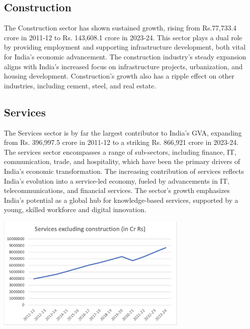 \documentclass[a4paper,12pt]{extarticle} %
\begin{document}
\subsection{Construction}
The Construction sector has shown sustained growth, rising from Rs.77,733.4 crore in 2011-12 to Rs. 143,608.1 crore in 2023-24. This sector plays a dual role by providing employment and supporting infrastructure development, both vital for India’s economic advancement. The construction industry’s steady expansion aligns with India’s increased focus on infrastructure projects, urbanization, and housing development. Construction’s growth also has a ripple effect on other industries, including cement, steel, and real estate.\\

\subsection{Services}
The Services sector is by far the largest contributor to India’s GVA, expanding from Rs. 396,997.5 crore in 2011-12 to a striking Rs. 866,921 crore in 2023-24. The services sector encompasses a range of sub-sectors, including finance, IT, communication, trade, and hospitality, which have been the primary drivers of India’s economic transformation. The increasing contribution of services reflects India’s evolution into a service-led economy, fueled by advancements in IT, telecommunications, and financial services. The sector’s growth emphasizes India’s potential as a global hub for knowledge-based services, supported by a young, skilled workforce and digital innovation.
\begin{center}
    \includegraphics[width=0.7\textwidth]{Q2/4.png} 
\end{center}\\
\end{document}
